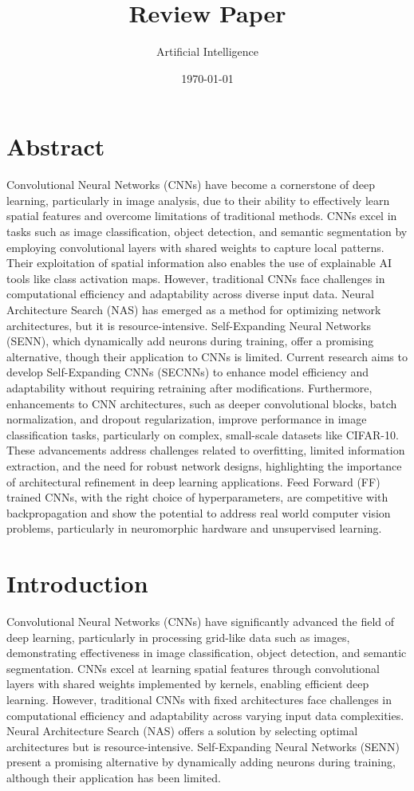 \documentclass{article}
\begin{document}
\title{Review Paper}
\author{Artificial Intelligence}
\date{\today}
\maketitle
\noindent
\twocolumn

\section*{Abstract}
Convolutional Neural Networks (CNNs) have become a cornerstone of deep learning, particularly in image analysis, due to their ability to effectively learn spatial features and overcome limitations of traditional methods. CNNs excel in tasks such as image classification, object detection, and semantic segmentation by employing convolutional layers with shared weights to capture local patterns. Their exploitation of spatial information also enables the use of explainable AI tools like class activation maps. However, traditional CNNs face challenges in computational efficiency and adaptability across diverse input data. Neural Architecture Search (NAS) has emerged as a method for optimizing network architectures, but it is resource-intensive. Self-Expanding Neural Networks (SENN), which dynamically add neurons during training, offer a promising alternative, though their application to CNNs is limited. Current research aims to develop Self-Expanding CNNs (SECNNs) to enhance model efficiency and adaptability without requiring retraining after modifications. Furthermore, enhancements to CNN architectures, such as deeper convolutional blocks, batch normalization, and dropout regularization, improve performance in image classification tasks, particularly on complex, small-scale datasets like CIFAR-10. These advancements address challenges related to overfitting, limited information extraction, and the need for robust network designs, highlighting the importance of architectural refinement in deep learning applications. Feed Forward (FF) trained CNNs, with the right choice of hyperparameters, are competitive with backpropagation and show the potential to address real world computer vision problems, particularly in neuromorphic hardware and unsupervised learning.


\section*{Introduction}
Convolutional Neural Networks (CNNs) have significantly advanced the field of deep learning, particularly in processing grid-like data such as images, demonstrating effectiveness in image classification, object detection, and semantic segmentation. CNNs excel at learning spatial features through convolutional layers with shared weights implemented by kernels, enabling efficient deep learning. However, traditional CNNs with fixed architectures face challenges in computational efficiency and adaptability across varying input data complexities. Neural Architecture Search (NAS) offers a solution by selecting optimal architectures but is resource-intensive. Self-Expanding Neural Networks (SENN) present a promising alternative by dynamically adding neurons during training, although their application has been limited.
\end{document}
